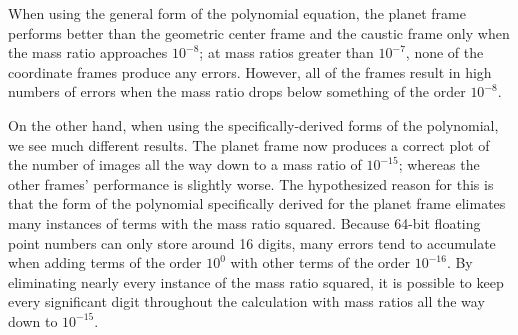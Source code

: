 \documentclass{article}
\begin{document}
When using the general form of the polynomial equation, the planet frame
performs better than the geometric center frame and the caustic frame only
when the mass ratio approaches $10^{-8}$; at mass ratios greater than
$10^{-7}$, none of the coordinate frames produce any errors. However, all
of the frames result in high numbers of errors when the mass ratio drops
below something of the order $10^{-8}$.

On the other hand, when using the specifically-derived forms of the
polynomial, we see much different results. The planet frame now produces
a correct plot of the number of images all the way down to a mass ratio of
$10^{-15}$; whereas the other frames' performance is slightly worse. The
hypothesized reason for this is that the form of the polynomial specifically
derived for the planet frame elimates many instances of terms with the
mass ratio squared. Because 64-bit floating point numbers can only store
around 16 digits, many errors tend to accumulate when adding terms of the
order $10^{0}$ with other terms of the order $10^{-16}$. By eliminating
nearly every instance of the mass ratio squared, it is possible to keep
every significant digit throughout the calculation with mass ratios all
the way down to $10^{-15}$.
\end{document}
